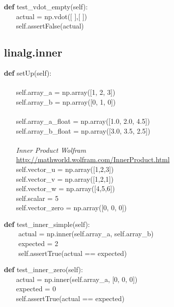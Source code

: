 \begin{algorithm}[H]
    \textbf{def} test\_vdot\_empty(self):
\\ $ ~~~~~~~~ $actual = np.vdot([ ],[ ])
\\ $ ~~~~~~~~ $self.assertFalse(actual)
\end{algorithm}

\subsection{linalg.inner}

\begin{algorithm}[H]
    \textbf{def} setUp(self):
\\
\\ $ ~~~~~~~~ $self.array\_a = np.array([1, 2, 3])
\\ $ ~~~~~~~~ $self.array\_b = np.array([0, 1, 0])
\\
\\ $ ~~~~~~~~ $self.array\_a\_float = np.array([1.0, 2.0, 4.5])
\\ $ ~~~~~~~~ $self.array\_b\_float = np.array([3.0, 3.5, 2.5])
\\
\\ $ ~~~~~~~~ $\textit{Inner Product Wolfram} \\$ ~~~~~~~~ $\url{http://mathworld.wolfram.com/InnerProduct.html}
\\ $ ~~~~~~~~ $self.vector\_u = np.array([1,2,3])
\\ $ ~~~~~~~~ $self.vector\_v = np.array([1,2,1])
\\ $ ~~~~~~~~ $self.vector\_w = np.array([4,5,6])
\\ $ ~~~~~~~~ $self.scalar = 5
\\ $ ~~~~~~~~ $self.vector\_zero = np.array([0, 0, 0])
\end{algorithm}


\begin{algorithm}[H]
	\textbf{def} test\_inner\_simple(self):
\\ $ ~~~~~~~~ $	actual = np.inner(self.array\_a, self.array\_b)
\\ $ ~~~~~~~~ $	expected = 2
\\ $ ~~~~~~~~ $	self.assertTrue(actual == expected)
\end{algorithm}

\begin{algorithm}[H]
    \textbf{def} test\_inner\_zero(self):
\\ $ ~~~~~~~~ $actual = np.inner(self.array\_a, [0, 0, 0])
\\ $ ~~~~~~~~ $expected = 0
\\ $ ~~~~~~~~ $self.assertTrue(actual == expected)
\end{algorithm}

